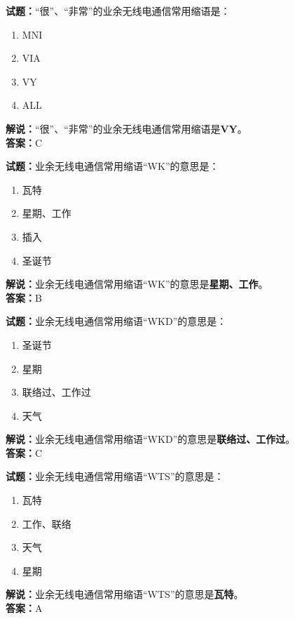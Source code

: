 \documentclass{ctexbook}
\begin{document}
\vspace{1em}

\textbf{试题：}“很”、“非常”的业余无线电通信常用缩语是：
\begin{enumerate}[leftmargin=3em]
  \item MNI
  \item VIA
  \item VY
  \item ALL
\end{enumerate}
\noindent\textbf{解说：}“很”、“非常”的业余无线电通信常用缩语是\textbf{VY}。\\\noindent\textbf{答案：}C

\vspace{1em}

\textbf{试题：}业余无线电通信常用缩语“WK”的意思是：
\begin{enumerate}[leftmargin=3em]
  \item 瓦特
  \item 星期、工作
  \item 插入
  \item 圣诞节
\end{enumerate}
\noindent\textbf{解说：}业余无线电通信常用缩语“WK”的意思是\textbf{星期、工作}。\\\noindent\textbf{答案：}B

\vspace{1em}

\textbf{试题：}业余无线电通信常用缩语“WKD”的意思是：
\begin{enumerate}[leftmargin=3em]
  \item 圣诞节
  \item 星期
  \item 联络过、工作过
  \item 天气
\end{enumerate}
\noindent\textbf{解说：}业余无线电通信常用缩语“WKD”的意思是\textbf{联络过、工作过}。\\\noindent\textbf{答案：}C

\vspace{1em}

\textbf{试题：}业余无线电通信常用缩语“WTS”的意思是：
\begin{enumerate}[leftmargin=3em]
  \item 瓦特
  \item 工作、联络
  \item 天气
  \item 星期
\end{enumerate}
\noindent\textbf{解说：}业余无线电通信常用缩语“WTS”的意思是\textbf{瓦特}。\\\noindent\textbf{答案：}A
\end{document}
